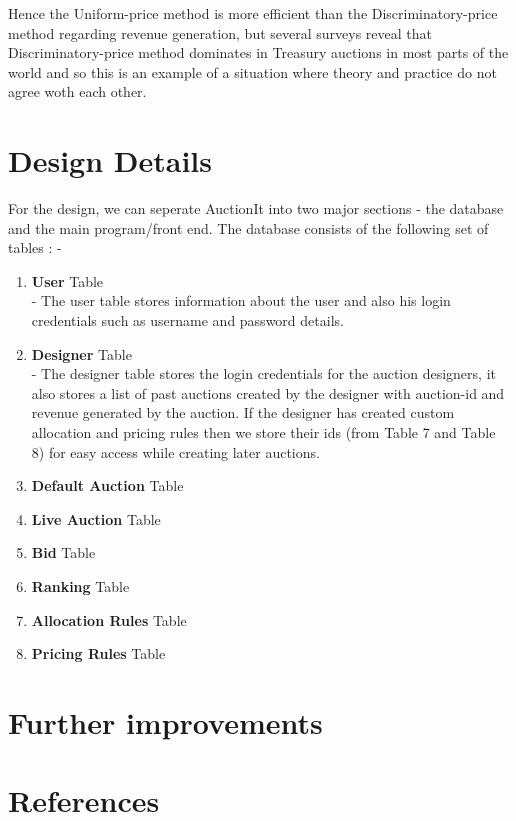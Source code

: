 \documentclass[a4paper]{article}
\begin{document}
Hence the Uniform-price method is more efficient than the Discriminatory-price method regarding revenue generation, but several surveys reveal that Discriminatory-price method dominates in Treasury auctions in most parts of the world and so this is an example of a situation where theory and practice do not agree woth each other.

\section*{Design Details}
For the design, we can seperate AuctionIt into two major sections -  the database and the main program/front end. The database consists of the following set of tables : - \\
\begin{enumerate}
    \item \textbf{User} Table\\
     - The user table stores information about the user and also his login credentials such as username and password details.
    \item \textbf{Designer} Table\\
    - The designer table stores the login credentials for the auction designers, it also stores a list of past auctions created by the designer with auction-id and revenue generated by the auction. If the designer has created custom allocation and pricing rules then we store their ids (from Table 7 and Table 8) for easy access while creating later auctions.
    \item \textbf{Default Auction} Table
    \item \textbf{Live Auction} Table
    \item \textbf{Bid} Table
    \item \textbf{Ranking} Table
    \item \textbf{Allocation Rules} Table
    \item \textbf{Pricing Rules} Table
\end{enumerate}
\section*{Further improvements}

\section*{References}
\end{document}
